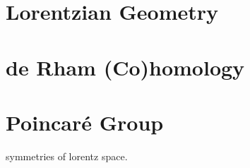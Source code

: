 \documentclass[UKenglish]{beamer}
\begin{document}
\section{Lorentzian Geometry}
%
%    

\section{de Rham (Co)homology}


\section{Poincar\'e Group}

\begin{frame}{}
symmetries of lorentz space.
\end{frame}
\end{document}

